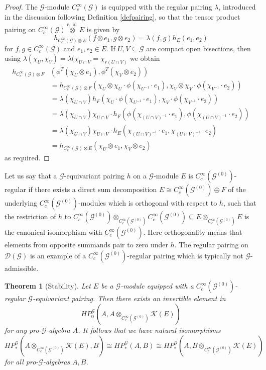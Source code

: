\documentclass{amsart}
\newtheorem{thm}{Theorem}[section]
\newcommand{\G}{\mathcal{G}}
\newcommand{\D}{\mathcal{D}}
\newcommand{\K}{\mathcal{K}}
\newcommand{\ccinfty}{C_c^\infty}
\DeclareMathOperator{\id}{id}
\begin{document}
\begin{proof}
The $ \G $-module $ \ccinfty(\G) $ is equipped with the regular pairing $ \lambda $, introduced in the discussion following Definition \ref{defpairing}, so that the tensor product pairing on $ \ccinfty(\G) \stackrel{r,\id}{\otimes} E $ is given by 
$$ 
h_{\ccinfty(\G) \otimes E}(f \otimes e_1, g \otimes e_2) = \lambda(f,g) h_E(e_1, e_2)
$$
for $ f,g \in \ccinfty(\G) $ and $ e_1, e_2 \in E $. If $ U, V \subseteq \G $ are compact open bisections, then using $ \lambda(\chi_U, \chi_V) = \lambda(\chi_{U \cap V} = \chi_{r(U \cap V)} $ we obtain
\begin{align*}
h_{\ccinfty(\G) \otimes F}&(\phi^T(\chi_U \otimes e_1), \phi^T(\chi_V \otimes e_2)) \\
&= h_{\ccinfty(\G) \otimes F}(\chi_U \otimes \chi_U \cdot \phi(\chi_{U^{-1}} \cdot e_1), \chi_V \otimes \chi_V \cdot \phi(\chi_{V^{-1}} \cdot e_2)) \\
&= \lambda(\chi_{U \cap V}) h_F(\chi_U \cdot \phi(\chi_{U^{-1}} \cdot e_1), \chi_V \cdot \phi(\chi_{V^{-1}} \cdot e_2)) \\
&= \lambda(\chi_{U \cap V}) \chi_{U \cap V} \cdot h_F(\phi(\chi_{(U \cap V)^{-1}} \cdot e_1), \phi(\chi_{(U \cap V)^{-1}} \cdot e_2)) \\
&= \lambda(\chi_{U \cap V}) \chi_{U \cap V} \cdot h_E(\chi_{(U \cap V)^{-1}} \cdot e_1, \chi_{(U \cap V)^{-1}} \cdot e_2) \\
&= h_{\ccinfty(\G) \otimes E}(\chi_U \otimes e_1, \chi_V \otimes e_2)
\end{align*} 
as required.  
\end{proof}

Let us say that a $ \G $-equivariant pairing $ h $ on a $ \G $-module $ E $ is $ \ccinfty(\G^{(0)}) $-regular if there exists a direct sum decomposition $ E \cong \ccinfty(\G^{(0)}) \oplus F $ of the underlying $ \ccinfty(\G^{(0)}) $-modules which is orthogonal with respect to $ h $, such that the restriction of $ h $ to $ \ccinfty(\G^{(0)}) \otimes_{\ccinfty(\G^{(0)})} \ccinfty(\G^{(0)}) \subseteq E \otimes_{\ccinfty(\G^{(0)})} E $ is the canonical isomorphism with $ \ccinfty(\G^{(0)}) $. Here orthogonality means that elements from opposite summands pair to zero under $ h $. The regular pairing on $ \D(\G) $ is an example of a $ \ccinfty(\G^{(0)}) $-regular pairing which is typically not $ \G $-admissible. 

\begin{thm}[Stability]
Let $ E $ be a $ \G $-module equipped with a $ \ccinfty(\G^{(0)}) $-regular $ \G $-equivariant pairing. 
Then there exists an invertible element in 
$$ 
HP^\G_0(A, A \otimes_{\ccinfty(\G^{(0)})} \K(E))
$$ 
for any pro-$ \G $-algebra $ A $. It follows that we have natural isomorphisms 
$$
HP^\G_*(A \otimes_{\ccinfty(\G^{(0)})} \K(E), B) \cong HP^\G_*(A, B) \cong HP^\G_*(A, B \otimes_{\ccinfty(\G^{(0)})} \K(E))
$$
for all pro-$ \G $-algebras $ A, B $. 
\end{thm}
\end{document}
